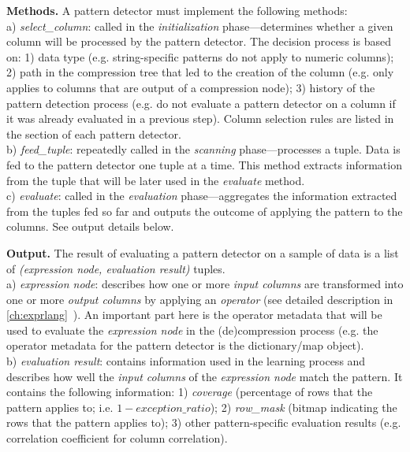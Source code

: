 \textbf{Methods.} A pattern detector must implement the following methods:\\
a) \textit{select\_column}: called in the \textit{initialization} phase---determines whether a given column will be processed by the pattern detector. The decision process is based on: 1) data type (e.g. string-specific patterns do not apply to numeric columns); 2) path in the compression tree that led to the creation of the column (e.g.  only applies to columns that are output of a  compression node); 3) history of the pattern detection process (e.g. do not evaluate a pattern detector on a column if it was already evaluated in a previous step). Column selection rules are listed in the section of each pattern detector.\\
b) \textit{feed\_tuple}: repeatedly called in the \textit{scanning} phase---processes a tuple. Data is fed to the pattern detector one tuple at a time. This method extracts information from the tuple that will be later used in the \textit{evaluate} method.\\
c) \textit{evaluate}: called in the \textit{evaluation} phase---aggregates the information extracted from the tuples fed so far and outputs the outcome of applying the pattern to the columns. See output details below.

\textbf{Output.} The result of evaluating a pattern detector on a sample of data is a list of \textit{(expression node, evaluation result)} tuples.\\
a) \textit{expression node}: describes how one or more \textit{input columns} are transformed into one or more \textit{output columns} by applying an \textit{operator} (see detailed description in \ref{ch:exprlang}~). An important part here is the operator metadata that will be used to evaluate the \textit{expression node} in the (de)compression process (e.g. the operator metadata for the  pattern detector is the dictionary/map object).\\
b) \textit{evaluation result}: contains information used in the learning process and describes how well the \textit{input columns} of the \textit{expression node} match the pattern. It contains the following information: 1) \textit{coverage} (percentage of rows that the pattern applies to; i.e. \(1 - exception\_ratio\)); 2) \textit{row\_mask} (bitmap indicating the rows that the pattern applies to); 3) other pattern-specific evaluation results (e.g. correlation coefficient for column correlation).

